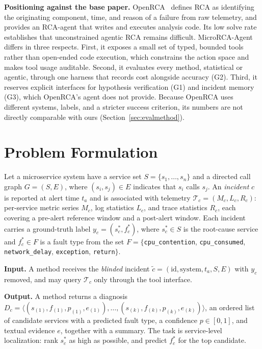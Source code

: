 \documentclass[conference]{IEEEtran}
\begin{document}
\textbf{Positioning against the base paper.} OpenRCA~\cite{xu2025openrca} defines RCA as identifying the originating component, time, and reason of a failure from raw telemetry, and provides an RCA-agent that writes and executes analysis code. Its low solve rate establishes that unconstrained agentic RCA remains difficult. MicroRCA-Agent differs in three respects. First, it exposes a small set of typed, bounded tools rather than open-ended code execution, which constrains the action space and makes tool usage auditable. Second, it evaluates every method, statistical or agentic, through one harness that records cost alongside accuracy (G2). Third, it reserves explicit interfaces for hypothesis verification (G1) and incident memory (G3), which OpenRCA's agent does not provide. Because OpenRCA uses different systems, labels, and a stricter success criterion, its numbers are not directly comparable with ours (Section~\ref{sec:evalmethod}).

\section{Problem Formulation}\label{sec:problem}

Let a microservice system have a service set $S=\{s_1,\dots,s_n\}$ and a directed call graph $G=(S,E)$, where $(s_i,s_j)\in E$ indicates that $s_i$ calls $s_j$. An \emph{incident} $c$ is reported at alert time $t_a$ and is associated with telemetry $\mathcal{T}_c=(M_c,L_c,R_c)$: per-service metric series $M_c$, log statistics $L_c$, and trace statistics $R_c$, each covering a pre-alert reference window and a post-alert window. Each incident carries a ground-truth label $y_c=(s^\ast_c,f^\ast_c)$, where $s^\ast_c\in S$ is the root-cause service and $f^\ast_c\in F$ is a fault type from the set $F=\{$\texttt{cpu\_contention}, \texttt{cpu\_consumed}, \texttt{network\_delay}, \texttt{exception}, \texttt{return}$\}$.

\textbf{Input.} A method receives the \emph{blinded} incident $\tilde{c}=(\text{id}, \text{system}, t_a, S, E)$ with $y_c$ removed, and may query $\mathcal{T}_c$ only through the tool interface.

\textbf{Output.} A method returns a diagnosis $D_c=\langle (s_{(1)},f_{(1)},p_{(1)},e_{(1)}),\dots,(s_{(k)},f_{(k)},p_{(k)},e_{(k)})\rangle$, an ordered list of candidate services with a predicted fault type, a confidence $p\in[0,1]$, and textual evidence $e$, together with a summary. The task is service-level localization: rank $s^\ast_c$ as high as possible, and predict $f^\ast_c$ for the top candidate.
\end{document}
